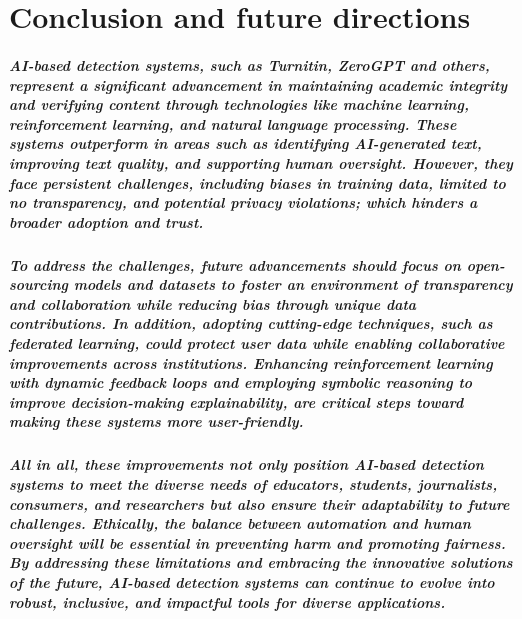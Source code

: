 \documentclass[12pt,letterpaper,final]{report}
\begin{document}
\chapter{Conclusion and future directions}
\paragraph{
AI-based detection systems, such as Turnitin, ZeroGPT and others, represent a significant advancement in maintaining academic integrity and verifying content through technologies like machine learning, reinforcement learning, and natural language processing. These systems outperform in areas such as identifying AI-generated text, improving text quality, and supporting human oversight. However, they face persistent challenges, including biases in training data, limited to no transparency, and potential privacy violations; which hinders a broader adoption and trust.
}

\paragraph{
To address the challenges, future advancements should focus on open-sourcing models and datasets to foster an environment of transparency and collaboration while reducing bias through unique data contributions. In addition, adopting cutting-edge techniques, such as federated learning, could protect user data while enabling collaborative improvements across institutions. Enhancing reinforcement learning with dynamic feedback loops and employing symbolic reasoning to improve decision-making explainability, are critical steps toward making these systems more user-friendly.
}

\paragraph{
All in all, these improvements not only position AI-based detection systems to meet the diverse needs of educators, students, journalists, consumers, and researchers but also ensure their adaptability to future challenges. Ethically, the balance between automation and human oversight will be essential in preventing harm and promoting fairness. By addressing these limitations and embracing the innovative solutions of the future, AI-based detection systems can continue to evolve into robust, inclusive, and impactful tools for diverse applications.
}

\restoregeometry
{}
\printbibliography
\restoregeometry
\end{document}
